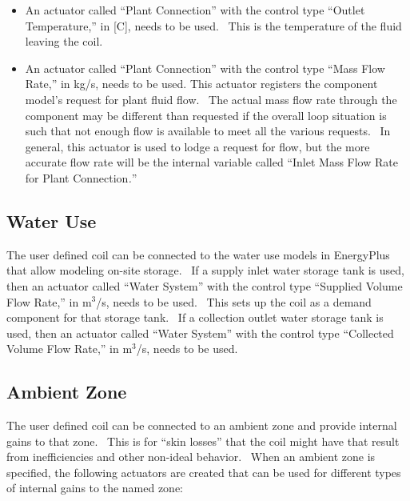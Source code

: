 \begin{itemize}
\item
  An actuator called ``Plant Connection'' with the control type ``Outlet Temperature,'' in {[}C{]}, needs to be used.~ This is the temperature of the fluid leaving the coil.
\item
  An actuator called ``Plant Connection'' with the control type ``Mass Flow Rate,'' in kg/s, needs to be used. This actuator registers the component model's request for plant fluid flow.~ The actual mass flow rate through the component may be different than requested if the overall loop situation is such that not enough flow is available to meet all the various requests.~ In general, this actuator is used to lodge a request for flow, but the more accurate flow rate will be the internal variable called ``Inlet Mass Flow Rate for Plant Connection\emph{.}''
\end{itemize}

\subsection{Water Use}\label{water-use}

The user defined coil can be connected to the water use models in EnergyPlus that allow modeling on-site storage.~ If a supply inlet water storage tank is used, then an actuator called ``Water System'' with the control type ``Supplied Volume Flow Rate,'' in m\(^{3}\)/s, needs to be used.~ This sets up the coil as a demand component for that storage tank.~ If a collection outlet water storage tank is used, then an actuator called ``Water System'' with the control type ``Collected Volume Flow Rate,'' in m\(^{3}\)/s, needs to be used.

\subsection{Ambient Zone}\label{ambient-zone}

The user defined coil can be connected to an ambient zone and provide internal gains to that zone.~ This is for ``skin losses'' that the coil might have that result from inefficiencies and other non-ideal behavior.~ When an ambient zone is specified, the following actuators are created that can be used for different types of internal gains to the named zone:


